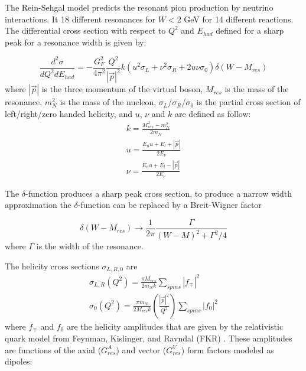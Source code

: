 The Rein-Sehgal model \cite{REIN198179} predicts the resonant pion production by neutrino interactions. It 18 different resonances for $W<2$ GeV for 14 different reactions. The differential cross section with respect to $Q^2$ and $E_{had}$ defined for a sharp peak for a resonance width is given by:

\begin{equation}
    \frac{d^2\sigma}{dQ^2dE_{had}}=-\frac{G^2_F}{4\pi^2}\frac{Q^2}{|\Vec{p}|^2} k (u^2\sigma_L + \nu^2\sigma_R + 2u\nu\sigma_0)\delta(W-M_{res})
\end{equation}
where $|\Vec{p}|$ is the three momentum of the virtual boson, $M_{res}$ is the mass of the resonance, $m^2_N$ is the mass of the nucleon, $\sigma_L$/$\sigma_R$/$\sigma_0$ is the partial cross section of left/right/zero handed helicity, and $u$, $\nu$ and $k$ are defined as follow:
\begin{equation}
    \begin{split}
        k = \frac{M^2_{res}-m^2_N}{2m_N}\\
        u = \frac{E_nu + E_l + |\Vec{p}|}{2E_\nu}\\
        \nu = \frac{E_nu + E_l - |\Vec{p}|}{2E_\nu}
    \end{split}
\end{equation}

The $\delta$-function produces a sharp peak cross section, to produce a narrow width approximation the $\delta$-function can be replaced by a Breit-Wigner factor

\begin{equation}
    \delta(W-M_{res})\rightarrow\frac{1}{2\pi}\frac{\Gamma}{(W-M)^2+\Gamma^2/4}
\end{equation}
where $\Gamma$ is the width of the resonance.

The helicity cross sections $\sigma_{L,R,0}$ are 
\begin{equation}
    \begin{split}
        \sigma_{L,R}(Q^2) = \frac{\pi M_{res}}{2m_N k}\sum_{spins}|f_\mp|^2\\
        \sigma_{0}(Q^2) = \frac{\pi m_N }{2 M_{res} k}\left(\frac{|\Vec{p}|^2}{Q^2}\right)\sum_{spins}|f_0|^2
    \end{split}
\end{equation}
where $f_\mp$ and $f_0$ are the helicity amplitudes that are given by the relativistic quark model from Feynman, Kislinger, and Ravndal (FKR) \cite{PhysRevD.3.2706}. These amplitudes are functions of the axial ($G^A_{res}$) and vector ($G^V_{res}$) form factors modeled as dipoles:

